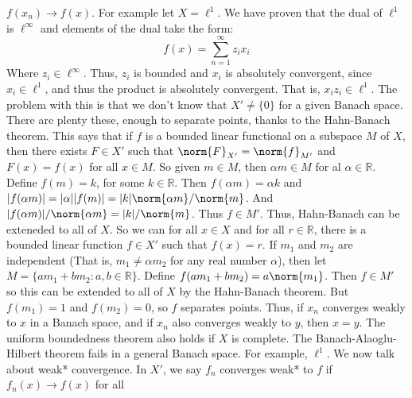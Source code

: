             $f(x_{n})\rightarrow{f(x)}$.
            For example let $X=\ell^{1}$. We have proven that the
            dual of $\ell^{1}$ is $\ell^{\infty}$ and elements
            of the dual take the form:
            \begin{equation}
                f(x)=\sum_{n=1}^{\infty}z_{i}x_{i}
            \end{equation}
            Where $z_{i}\in\ell^{\infty}$. Thus, $z_{i}$ is
            bounded and $x_{i}$ is absolutely convergent,
            since $x_{i}\in\ell^{1}$, and thus the product
            is absolutely convergent. That is,
            $x_{i}z_{i}\in\ell^{1}$. The problem with this is
            that we don't know that $X'\ne\{0\}$ for a given
            Banach space. There are plenty these, enough to
            separate points, thanks to the Hahn-Banach theorem.
            This says that if $f$ is a bounded linear functional
            on a subspace $M$ of $X$, then there exists
            $F\in{X'}$ such that
            $\norm{F}_{X'}=\norm{f}_{M'}$ and
            $F(x)=f(x)$ for all $x\in{M}$. So given $m\in{M}$,
            then $\alpha{m}\in{M}$ for al $\alpha\in\mathbb{R}$.
            Define $f(m)=k$, for some $k\in\mathbb{R}$. Then
            $f(\alpha{m})=\alpha{k}$ and
            $|f(\alpha{m})|=|\alpha||f(m)|%
             =|k|\norm{\alpha{m}}/\norm{m}$. And
             $|f(\alpha{m})|/\norm{\alpha{m}}=|k|/\norm{m}$.
            Thus $f\in{M'}$. Thus, Hahn-Banach can be exteneded
            to all of $X$. So we can for all $x\in{X}$ and for
            all $r\in\mathbb{R}$, there is a bounded linear
            function $f\in{X'}$ such that
            $f(x)=r$. If $m_{1}$ and $m_{2}$ are independent
            (That is, $m_{1}\ne\alpha{m}_{2}$ for any real
            number $\alpha$), then let
            $M=\{am_{1}+bm_{2}:a,b\in\mathbb{R}\}$. Define
            $f(am_{1}+bm_{2})=a\norm{m_{1}}$.
            Then $f\in{M'}$ so this
            can be extended to all of $X$ by the Hahn-Banach
            theorem. But $f(m_{1})=1$ and
            $f(m_{2})=0$, so $f$ separates points. Thus,
            if $x_{n}$ converges weakly to $x$ in a
            Banach space, and if $x_{n}$ also converges weakly
            to $y$, then $x=y$. The uniform boundedness theorem
            also holds if $X$ is complete. The
            Banach-Alaoglu-Hilbert theorem fails in a general
            Banach space. For example, $\ell^{1}$. We now talk
            about weak* convergence. In $X'$, we say
            $f_{n}$ converges weak* to $f$ if
            $f_{n}(x)\rightarrow{f(x)}$ for all
